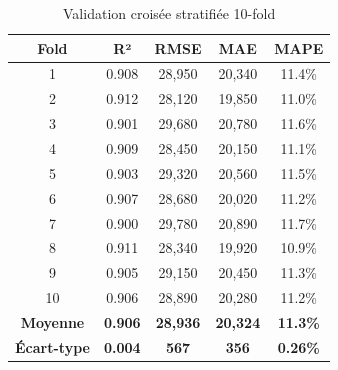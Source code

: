 \begin{table}[H]
\centering
\caption{Validation croisée stratifiée 10-fold}
\begin{tabular}{|c|c|c|c|c|}
\hline
\textbf{Fold} & \textbf{R²} & \textbf{RMSE} & \textbf{MAE} & \textbf{MAPE} \\
\hline
1 & 0.908 & 28,950 & 20,340 & 11.4\% \\
2 & 0.912 & 28,120 & 19,850 & 11.0\% \\
3 & 0.901 & 29,680 & 20,780 & 11.6\% \\
4 & 0.909 & 28,450 & 20,150 & 11.1\% \\
5 & 0.903 & 29,320 & 20,560 & 11.5\% \\
6 & 0.907 & 28,680 & 20,020 & 11.2\% \\
7 & 0.900 & 29,780 & 20,890 & 11.7\% \\
8 & 0.911 & 28,340 & 19,920 & 10.9\% \\
9 & 0.905 & 29,150 & 20,450 & 11.3\% \\
10 & 0.906 & 28,890 & 20,280 & 11.2\% \\
\hline
\textbf{Moyenne} & \textbf{0.906} & \textbf{28,936} & \textbf{20,324} & \textbf{11.3\%} \\
\textbf{Écart-type} & \textbf{0.004} & \textbf{567} & \textbf{356} & \textbf{0.26\%} \\
\hline
\end{tabular}
\end{table}
